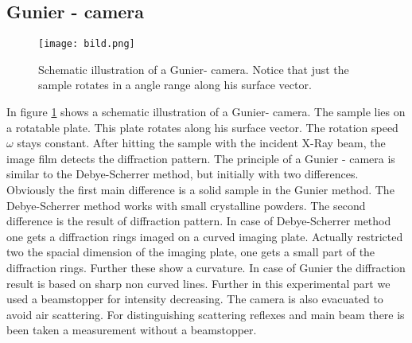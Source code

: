 	\subsection{Gunier - camera}
	\begin{figure}
		\centering
		\texttt{[image: bild.png]}
		\caption[Schematic illustration of a Gunier- camera]{Schematic illustration of a Gunier- camera. Notice that just the sample rotates in a angle range along his surface vector.}
		\label{Gunier}
	\end{figure}
	In figure \ref{Gunier} shows a schematic illustration of a Gunier- camera. The sample lies on a rotatable plate. This plate rotates along his surface vector. The rotation speed $\omega$ stays constant. After hitting the sample with the incident X-Ray beam, the image film detects the diffraction pattern. The principle of a Gunier - camera is similar to the Debye-Scherrer method, but initially with two differences. Obviously the first main difference is a solid sample in the Gunier method. The Debye-Scherrer method works with small crystalline powders. The second difference is the result of diffraction pattern. In case of Debye-Scherrer method one gets a diffraction rings imaged on a curved imaging plate. Actually restricted two the spacial dimension of the imaging plate, one gets a small part of the diffraction rings. Further these show a curvature. In case of Gunier the diffraction result is based on sharp non curved lines. Further in this experimental part we used a beamstopper for intensity decreasing. The camera is also evacuated to avoid air scattering. For distinguishing scattering reflexes and main beam there is been taken a measurement without a beamstopper.
